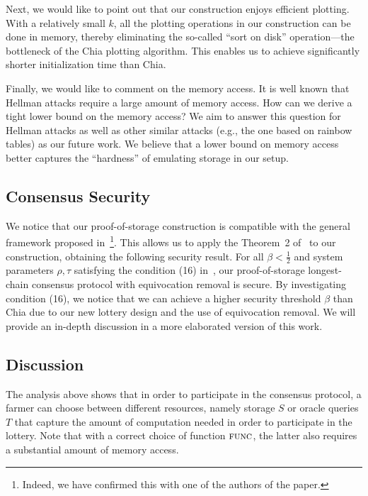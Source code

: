 \documentclass[conference]{IEEEtran}
\newcommand{\func}{\textsc{func}}
\begin{document}
Next, we would like to point out that  our construction enjoys efficient plotting. With a relatively small $k$, all the plotting operations in our construction can be done in memory, thereby eliminating the so-called ``sort on disk'' operation---the bottleneck of the Chia plotting algorithm. This enables us to achieve significantly shorter initialization time than Chia.

Finally, we would like to comment on the memory access. It is well known that Hellman attacks require a large amount of memory access. How can we derive a tight lower bound on the memory access? We aim to answer this question for Hellman attacks as well as other similar attacks (e.g., the one based on rainbow tables) as our future work. We believe that a lower bound on memory access better captures the ``hardness'' of emulating storage in our setup.

\subsection{Consensus Security}

We notice that our proof-of-storage construction is compatible with the general framework proposed in~\cite{blockchain_capacity}\footnote{Indeed, we have confirmed this with one of the authors of the paper.}. This allows us to apply the Theorem~2 of~\cite{blockchain_capacity} to our construction, obtaining the following security result.
For all $\beta < \frac{1}{2}$ and system parameters $\rho, \tau$ satisfying the condition (16) in~\cite{blockchain_capacity}, our proof-of-storage longest-chain consensus protocol with equivocation removal is secure. By investigating condition (16), we notice that we can achieve a higher security threshold $\beta$ than Chia due to our new lottery design and the use of equivocation removal. We will provide an in-depth discussion  in a more elaborated version of this work.

\subsection{Discussion}

The analysis above shows that in order to participate in the consensus protocol, a farmer can choose between different resources, namely storage $S$ or oracle queries $T$ that capture the amount of computation needed in order to participate in the lottery. Note that with a correct choice of function $\func$, the latter also requires a substantial amount of memory access.
\end{document}
